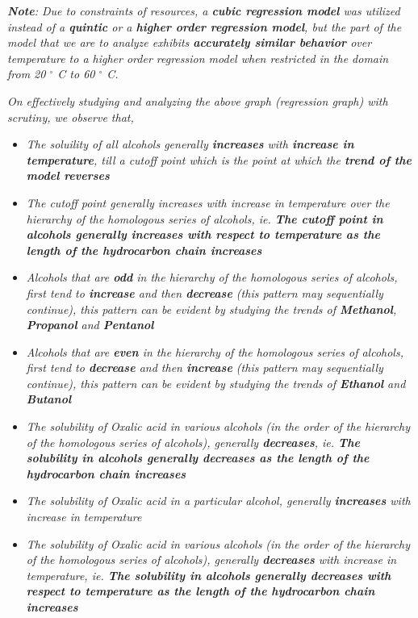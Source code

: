 \textit{\textbf{Note}: Due to constraints of resources, a \textbf{cubic regression model} was utilized instead of a \textbf{quintic} or a \textbf{higher order regression model}, but the part of the model that we are to analyze exhibits \textbf{accurately similar behavior} over temperature to a higher order regression model when restricted in the domain from 20 $^\circ$ C to 60 $^\circ$ C.}

\textit{On effectively studying and analyzing the above graph (regression graph) with scrutiny, we observe that,}

	\begin{itemize}
		\item \textit{The soluility of all alcohols generally \textbf{increases} with \textbf{increase in temperature}, till a cutoff point which is the point at which the \textbf{trend of the model reverses}}
		\item \textit{The cutoff point generally increases with increase in temperature over the hierarchy of the homologous series of alcohols, ie. \textbf{The cutoff point in alcohols generally increases with respect to temperature as the length of the hydrocarbon chain increases}}
		\item \textit{Alcohols that are \textbf{odd} in the hierarchy of the homologous series of alcohols, first tend to \textbf{increase} and then \textbf{decrease} (this pattern may sequentially continue), this pattern can be evident by studying the trends of \textbf{Methanol}, \textbf{Propanol} and \textbf{Pentanol}}
		\item \textit{Alcohols that are \textbf{even} in the hierarchy of the homologous series of alcohols, first tend to \textbf{decrease} and then \textbf{increase} (this pattern may sequentially continue), this pattern can be evident by studying the trends of \textbf{Ethanol} and \textbf{Butanol}}
		\item \textit{The solubility of Oxalic acid in various alcohols (in the order of the hierarchy of the homologous series of alcohols), generally \textbf{decreases}, ie. \textbf{The solubility in alcohols generally decreases as the length of the hydrocarbon chain increases}}
		\item \textit{The solubility of Oxalic acid in a particular alcohol, generally \textbf{increases} with increase in temperature}
		\item \textit{The solubility of Oxalic acid in various alcohols (in the order of the hierarchy of the homologous series of alcohols), generally \textbf{decreases} with increase in temperature, ie. \textbf{The solubility in alcohols generally decreases with respect to temperature as the length of the hydrocarbon chain increases}}
	\end{itemize}


